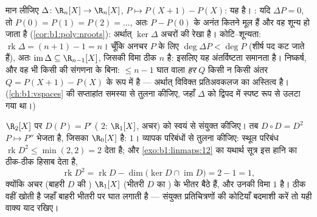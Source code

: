 \begin{example}[कोटि--शून्यता काम पर: अंतर संकारक]
\label{ex:b1:linmaps:delta}
मान लीजिए $\Delta \colon \R_n[X] \to \R_n[X]$, $P \mapsto P(X+1) - P(X)$: यह
 है। : यदि $\Delta P = 0$, तो $P(0) = P(1) = P(2) = \dots$, अतः $P
- P(0)$ के अनंत कितने मूल हैं और वह शून्य हो जाता है
(\cref{cor:b1:poly:nroots}): अर्थात् $\ker\Delta$ अचरों की रेखा है।
कोटि--शून्यता: $\operatorname{rk}\Delta = (n + 1) - 1 = n$। चूँकि अनचर $P$
के लिए $\deg \Delta P < \deg P$ (शीर्ष पद कट जाते हैं), अतः
$\operatorname{im}\Delta \subseteq \R_{n-1}[X]$, जिसकी विमा ठीक $n$ है:
इसलिए यह अंतर्विष्टता समानता है। निष्कर्ष, और वह भी किसी  की
संगणना के बिना: $\leq n - 1$ घात वाला \emph{हर}  $Q$ किसी न किसी अंतर
$Q = P(X+1) - P(X)$ के रूप में है --- अर्थात् विविक्त प्रतिअवकलज का अस्तित्व
है। (\cref{ch:b1:vspaces} की सप्ताहांत समस्या से तुलना कीजिए, जहाँ $\Delta$
को द्विपद  में स्पष्ट रूप से उलटा गया था।)
\end{example}

\begin{example}[किसी संयुक्त प्रतिचित्रण के अनुदिश कोटि का लेखा-जोखा]
\label{ex:b1:linmaps:rankbookkeeping}
$\R_2[X]$ पर  $D(P) = P'$ ( $2$:  $\R_1[X]$,  अचर) को
स्वयं से संयुक्त कीजिए। तब $D \circ D = D^2$ $P \mapsto P''$ भेजता है, जिसका
 $\R_0[X]$ है:  $1$। व्यापक परिबंधों से तुलना कीजिए: स्थूल
परिबंध $\operatorname{rk} D^2 \leq \min(2, 2) = 2$ देता है; और
\cref{exo:b1:linmaps:12} का यथार्थ सूत्र इस हानि का ठीक-ठीक हिसाब देता है,
\[
\operatorname{rk} D^2 = \operatorname{rk} D -
\dim\bigl(\ker D \cap \operatorname{im} D\bigr) = 2 - 1 = 1 ,
\]
क्योंकि अचर (बाहरी $D$ की ) $\R_1[X]$ (भीतरी $D$ का ) के भीतर
बैठे हैं, और उनकी विमा $1$ है।  ठीक वहीं खोती है जहाँ बाहरी  भीतरी
 पर घात लगाती है --- संयुक्त प्रतिचित्रणों की कोटियाँ बदमाशी करें
तो यही वाक्य याद रखिए।
\end{example}

